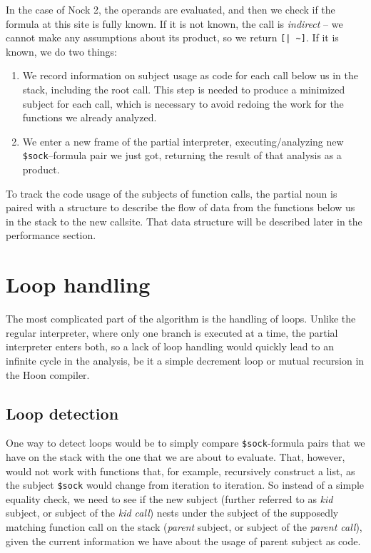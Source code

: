 \documentclass[twoside]{article}
\begin{document}
\noindent
In the case of Nock 2, the operands are evaluated, and then we check if the formula at this site is fully known.  If it is not known, the call is \emph{indirect} -- we cannot make any assumptions about its product, so we return \lstinline[style=inlinecode]{[| ~]}.  If it is known, we do two things:

\begin{enumerate}
\item We record information on subject usage as code for each call below us in the stack, including the root call.  This step is needed to produce a minimized subject for each call, which is necessary to avoid redoing the work for the functions we already analyzed.
\item We enter a new frame of the partial interpreter, executing/analyzing new \lstinline[style=inlinecode]{$sock}--formula pair we just got, returning the result of that analysis as a product.
\end{enumerate}

To track the code usage of the subjects of function calls, the partial noun is paired with a structure to describe the flow of data from the functions below us in the stack to the new callsite.  That data structure will be described later in the performance section.

\section{Loop handling}

The most complicated part of the algorithm is the handling of loops.  Unlike the regular interpreter, where only one branch is executed at a time, the partial interpreter enters both, so a lack of loop handling would quickly lead to an infinite cycle in the analysis, be it a simple decrement loop or mutual recursion in the Hoon compiler.

\subsection{Loop detection}

One way to detect loops would be to simply compare \lstinline[style=inlinecode]{$sock}-formula pairs that we have on the stack with the one that we are about to evaluate.  That, however, would not work with functions that, for example, recursively construct a list, as the subject \lstinline[style=inlinecode]{$sock} would change from iteration to iteration.  So instead of a simple equality check, we need to see if the new subject (further referred to as \emph{kid} subject, or subject of the \emph{kid call}) nests under the subject of the supposedly matching function call on the stack (\emph{parent} subject, or subject of the \emph{parent call}), given the current information we have about the usage of parent subject as code.
\end{document}
